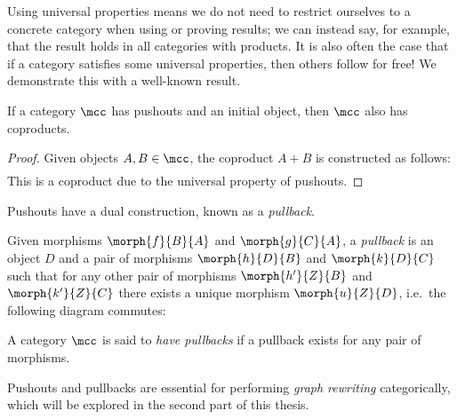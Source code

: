 Using universal properties means we do not need to restrict ourselves to a
concrete category when using or proving results; we can instead say, for
example, that the result holds in all categories with products.
It is also often the case that if a category satisfies some universal
properties, then others follow for free!
We demonstrate this with a well-known result.

\begin{lemma}
    \label{lem:coproducts-pushout}
    If a category \(\mcc\) has pushouts and an initial object, then \(\mcc\)
    also has coproducts.
\end{lemma}
\begin{proof}
    Given objects \(A,B \in \mcc\), the coproduct \(A + B\) is constructed as
    follows:
    \begin{gather*}
    \end{gather*}
    This is a coproduct due to the universal property of pushouts.
\end{proof}

Pushouts have a dual construction, known as a \emph{pullback}.

\begin{definition}[Pullback]
    Given morphisms \(\morph{f}{B}{A}\) and \(\morph{g}{C}{A}\), a
    \emph{pullback} is an object \(D\) and a pair of morphisms
    \(\morph{h}{D}{B}\) and \(\morph{k}{D}{C}\) such that for any other pair of
    morphisms \(\morph{h^\prime}{Z}{B}\) and \(\morph{k^\prime}{Z}{C}\) there
    exists a unique morphism \(\morph{u}{Z}{D}\), i.e.\ the following diagram
    commutes:
    \begin{center}
        
    \end{center}
    A category \(\mcc\) is said to \emph{have pullbacks} if a pullback exists
    for any pair of morphisms.
\end{definition}

Pushouts and pullbacks are essential for performing \emph{graph rewriting}
categorically, which will be explored in the second part of this thesis.